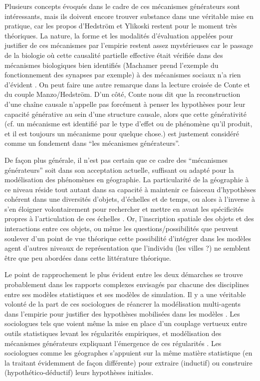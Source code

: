 Plusieurs concepts évoqués dans le cadre de ces mécanismes générateurs sont intéressants, mais ils doivent encore trouver substance dans une véritable mise en pratique, car les propos d'Hedström et Ylikoski restent pour le moment très théoriques. La nature, la forme et les modalités d'évaluation appelées pour justifier de ces mécanismes par l'empirie restent assez mystérieuses car le passage de la biologie où cette causalité partielle effective était vérifiée dans des mécanismes biologiques bien identifiés (Machamer prend l'exemple du fonctionnement des synapses par exemple) à des mécanismes sociaux n'a rien d'évident \autocite{Varenne2014b}. On peut faire une autre remarque dans la lecture croisée de Conte et du couple Manzo/Hedström. D'un côté, Conte nous dit que la reconstruction d'une chaîne causale n'appelle pas forcément à penser les hypothèses pour leur capacité générative au sein d'une structure causale, alors que cette générativité (cf. un mécanisme est identifié par le type d'effet ou de phénomène qu'il produit, et il est toujours un mécanisme pour quelque chose.) est justement considéré comme un fondement dans \enquote{les mécanismes générateurs}.

De façon plus générale, il n'est pas certain que ce cadre des \enquote{mécanismes générateurs} soit dans son acceptation actuelle, suffisant ou adapté pour la modélisation des phénomènes en géographie. La particularité de la géographie à ce niveau réside tout autant dans sa capacité à maintenir ce faisceau d'hypothèses cohérent dans une diversités d'objets, d'échelles et de temps, ou alors à l'inverse à s'en éloigner volontairement pour rechercher et mettre en avant les spécificités propres à l'articulation de ces échelles \autocite{Sanders2001}. Or, l'inscription spatiale des objets et des interactions entre ces objets, ou même les questions/possibilités que peuvent soulever d'un point de vue théorique cette possibilité d'intégrer dans les modèles agent d'autres niveaux de représentation que l'individu (les villes \autocite{Sanders2006} ?) ne semblent être que peu abordées dans cette littérature théorique.

Le point de rapprochement le plus évident entre les deux démarches se trouve probablement dans les rapports complexes envisagés par chacune des disciplines entre ses modèles statistiques et ses modèles de simulation. Il y a une véritable volonté de la part de ces sociologues de réancrer  la modélisation multi-agents dans l'empirie pour justifier des hypothèses mobilisées dans les modèles \autocites{Manzo2005}[23]{Manzo2007}{Hedstrom2015}. Les sociologues tels que \textcite{Goldthorpe2001} voient même la mise en place d'un couplage vertueux entre outils statistiques levant les régularités empiriques, et modélisation des mécanismes générateurs expliquant l'émergence de ces régularités \autocite[50]{Manzo2005}. Les sociologues comme les géographes s'appuient sur la même matière statistique (en la traitant évidemment de façon différente) pour extraire (inductif) ou construire (hypothético-déductif) leurs hypothèses initiales.


